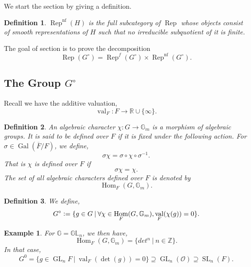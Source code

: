 \documentclass[8pt]{article}
\newtheorem{definition}{Definition}[section]
\newtheorem{example}{Example}[section]
\DeclareMathOperator{\GL}{GL}
\DeclareMathOperator{\SL}{SL}
\DeclareMathOperator{\Rep}{Rep}
\DeclareMathOperator{\Hom}{Hom}
\DeclareMathOperator{\val}{val}
\DeclareMathOperator{\nf}{nf}
\DeclareMathOperator{\Gal}{Gal}
\newcommand{\defeq}{\vcentcolon=}
\newcommand{\R}[0]{\mathbb{R}}
\newcommand{\Z}[0]{\mathbb{Z}}
\newcommand{\G}[0]{\mathbb{G}}
\newcommand{\sep}[0]{\:|\:}
\begin{document}
We start the section by giving a definition.

\begin{definition}
  $\Rep^{\nf}(H)$ is the full subcategory of $\Rep$ whose objects consist of smooth representations of $H$  such that no irreducible subquotient of it is finite.
\end{definition}

The goal of section is to prove the decomposition 
\begin{equation*}
  \Rep(G^\circ) = \Rep^f(G^\circ)\times \Rep^{\nf}(G^\circ).
\end{equation*}

\subsection{The Group $G^\circ$}


Recall we have the additive valuation,
\begin{equation*}
  \val_F:F\to\R\cup\{\infty\}.
\end{equation*}

\begin{definition}
  An algebraic character $\chi:G\to \G_m$ is a morphism of algebraic groups. It is said to be defined over $F$ if it is fixed under the following action.
  For $\sigma\in\Gal(\overline{F}/F)$, we define,
  \begin{equation*}
    \sigma\chi = \sigma\circ\chi\circ\sigma^{-1}.
  \end{equation*}
  That is $\chi$ is defined over $F$ if 
  \begin{equation*}
    \sigma\chi = \chi.
  \end{equation*}
  The set of all algebraic characters defined over $F$ is denoted by 
  \begin{equation*}
    \Hom_F(G,\G_m).
  \end{equation*}
\end{definition}

\begin{definition}
  We define,
  \begin{equation*}
    G^\circ \defeq \{g\in G\sep \forall \chi\in\Hom_F(G,\G_m), \val_F(\chi(g)) = 0\}.
  \end{equation*}
\end{definition}


\begin{example}
  For $\G=\mathbb{GL}_n$, we then have, 
  \begin{equation*}
    \Hom_F(G,\G_m) = \{det^n\sep n\in\Z\}.
  \end{equation*}
  In that case,
  \begin{equation*}
    G^0 = \{g\in\GL_nF\sep \val_F(\det(g)) = 0\}\supseteq \GL_n(\mathcal{O})\supseteq\SL_n(F).
  \end{equation*}
\end{example}
\end{document}
